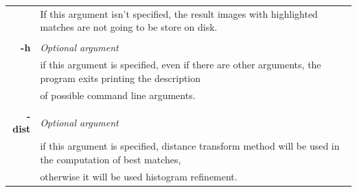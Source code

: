 \documentclass{article}
\begin{document}
\begin{table}[h]
\begin{tabular}{rl}
& {If this argument isn't specified, the result images with highlighted matches are not going to be store on disk.}\\
&\\
\textbf{-h} & {\textit{Optional argument}}\\
& {if this argument is specified, even if there are other arguments, the program exits printing the description}\\
&{of possible command line arguments.}\\
&\\
\textbf{-dist} & {\textit{Optional argument}}\\
& {if this argument is specified, distance transform method will be used in the computation of best matches,}\\
&{otherwise it will be used histogram refinement.}\\
\end{tabular}
\end{table}
\end{document}
